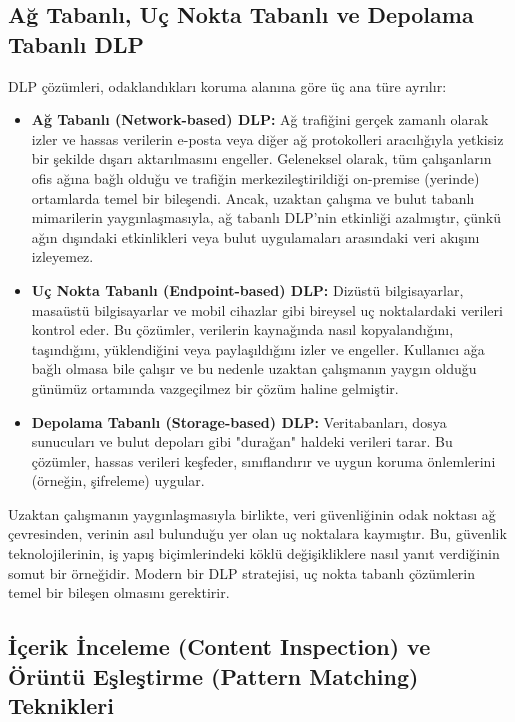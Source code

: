 \subsection{Ağ Tabanlı, Uç Nokta Tabanlı ve Depolama Tabanlı DLP}

DLP çözümleri, odaklandıkları koruma alanına göre üç ana türe ayrılır:

\begin{itemize}
    \item \textbf{Ağ Tabanlı (Network-based) DLP:} Ağ trafiğini gerçek zamanlı olarak izler ve hassas verilerin e-posta veya diğer ağ protokolleri aracılığıyla yetkisiz bir şekilde dışarı aktarılmasını engeller. Geleneksel olarak, tüm çalışanların ofis ağına bağlı olduğu ve trafiğin merkezileştirildiği on-premise (yerinde) ortamlarda temel bir bileşendi. Ancak, uzaktan çalışma ve bulut tabanlı mimarilerin yaygınlaşmasıyla, ağ tabanlı DLP'nin etkinliği azalmıştır, çünkü ağın dışındaki etkinlikleri veya bulut uygulamaları arasındaki veri akışını izleyemez.
    \item \textbf{Uç Nokta Tabanlı (Endpoint-based) DLP:} Dizüstü bilgisayarlar, masaüstü bilgisayarlar ve mobil cihazlar gibi bireysel uç noktalardaki verileri kontrol eder. Bu çözümler, verilerin kaynağında nasıl kopyalandığını, taşındığını, yüklendiğini veya paylaşıldığını izler ve engeller. Kullanıcı ağa bağlı olmasa bile çalışır ve bu nedenle uzaktan çalışmanın yaygın olduğu günümüz ortamında vazgeçilmez bir çözüm haline gelmiştir.
    \item \textbf{Depolama Tabanlı (Storage-based) DLP:} Veritabanları, dosya sunucuları ve bulut depoları gibi "durağan" haldeki verileri tarar. Bu çözümler, hassas verileri keşfeder, sınıflandırır ve uygun koruma önlemlerini (örneğin, şifreleme) uygular.
\end{itemize}

Uzaktan çalışmanın yaygınlaşmasıyla birlikte, veri güvenliğinin odak noktası ağ çevresinden, verinin asıl bulunduğu yer olan uç noktalara kaymıştır. Bu, güvenlik teknolojilerinin, iş yapış biçimlerindeki köklü değişikliklere nasıl yanıt verdiğinin somut bir örneğidir. Modern bir DLP stratejisi, uç nokta tabanlı çözümlerin temel bir bileşen olmasını gerektirir.

\subsection{İçerik İnceleme (Content Inspection) ve Örüntü Eşleştirme (Pattern Matching) Teknikleri}

